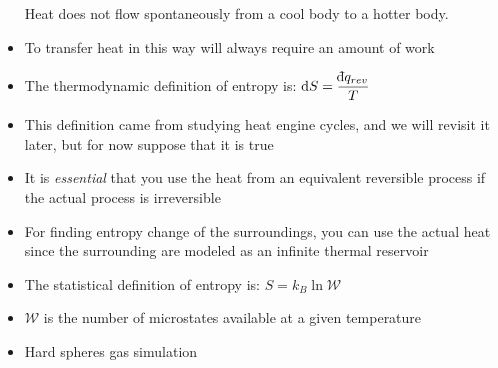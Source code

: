 \documentclass[12pt, openany, letterpaper]{memoir}
\begin{document}
\begin{itemize}
	Heat does not flow spontaneously from a cool body to a hotter body.	
	\item To transfer heat in this way will always require an amount of work
	\item The thermodynamic definition of entropy is: $\mathrm{d}S = \dfrac{\dbar q_{rev}}{T}$
	\item This definition came from studying heat engine cycles, and we will revisit it later, but for now suppose that it is true
	\item It is \emph{essential} that you use the heat from an equivalent reversible process if the actual process is irreversible
	\item For finding entropy change of the surroundings, you can use the actual heat since the surrounding are modeled as an infinite thermal reservoir
	\item The statistical definition of entropy is: $S=k_B\ln\mathcal{W}$
	\item $\mathcal{W}$ is the number of microstates available at a given temperature
	\item Hard spheres gas simulation
\end{itemize}
\end{document}
